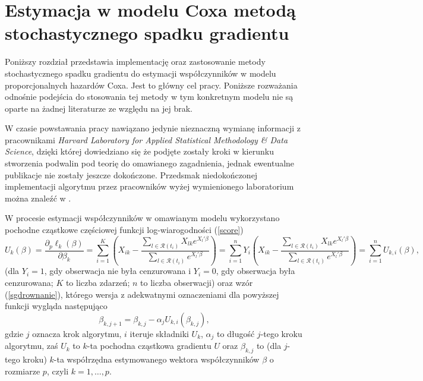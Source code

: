 \chapter{Estymacja w modelu Coxa metodą stochastycznego spadku gradientu}\label{rozdz4}

Poniższy rozdział przedstawia implementację oraz zastosowanie metody stochastycznego spadku gradientu do estymacji współczynników w modelu proporcjonalnych hazardów Coxa. Jest to główny cel pracy. Poniższe rozważania odnośnie podejścia do stosowania tej metody w tym konkretnym modelu nie są oparte na żadnej literaturze ze względu na jej brak.

W czasie powstawania pracy nawiązano jedynie nieznaczną wymianę informacji z pracownikami \textit{Harvard Laboratory for Applied Statistical Methodology \& Data Science}, dzięki której dowiedziano się że podjęte zostały kroki w kierunku stworzenia podwalin pod teorię do omawianego zagadnienia, jednak ewentualne publikacje nie zostały jeszcze dokończone. Przedsmak niedokończonej implementacji algorytmu przez pracowników wyżej wymienionego laboratorium można znaleźć w \cite{sgdpkg}.

W procesie estymacji współczynników w omawianym modelu wykorzystano pochodne cząstkowe częściowej funkcji log-wiarogodności (\ref{score})
\begin{equation*}
U_k(\beta)=\dfrac{\partial{}_{p}\ell_k(\beta)}{\partial\beta_k}=\sum\limits_{i=1}^{K}\left(X_{ik}-\dfrac{\sum\limits_{l\in \mathscr{R}(t_i)}^{} X_{lk} e^{X_l'\beta}}{\sum\limits_{l\in \mathscr{R}(t_i)}^{} e^{X_l'\beta}}\right)=\sum\limits_{i=1}^{n}Y_i\left(X_{ik}-\dfrac{\sum\limits_{l\in \mathscr{R}(t_i)}^{} X_{lk} e^{X_l'\beta}}{\sum\limits_{l\in \mathscr{R}(t_i)}^{} e^{X_l'\beta}}\right)=\sum\limits_{i=1}^{n}U_{k,i}(\beta),
\end{equation*}
(dla $Y_i = 1$, gdy obserwacja nie była cenzurowana i $Y_i = 0$, gdy obserwacja była cenzurowana; $K$ to liczba zdarzeń; $n$ to liczba obserwacji) oraz wzór (\ref{sgdrownanie}), którego wersja z adekwatnymi oznaczeniami dla powyższej funkcji wygląda następująco
\begin{equation}\label{opta}
\beta_{k,j+1} = \beta_{k,j} - \alpha_{j}U_{k,i}(\beta_{k,j}),
\end{equation}
gdzie $j$ oznacza krok algorytmu, $i$ iteruje składniki $U_{k}$, $\alpha_j$ to długość $j$-tego kroku algorytmu, zaś $U_{k}$ to $k$-ta pochodna cząstkowa gradientu $U$ oraz $\beta_{k,j}$ to (dla $j$-tego kroku) $k$-ta współrzędna estymowanego wektora współczynników $\beta$ o rozmiarze $p$, czyli $k=1,\dots,p$. 

